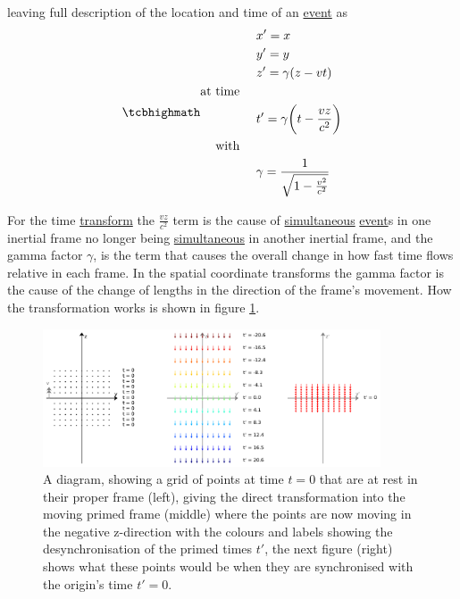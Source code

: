 leaving full description of the location and time of an \hyperlink{def-event}{event} as
\begin{equation}%
	\mhl{
		\begin{aligned}
			 & x'=x                                         \\ & y'=y \\ &z' = \gamma (z-vt)  \\
			\text{at time \ \ \ }                           \\
			 & t'=\gamma \bigg(t-\frac{vz}{c^2}\bigg)       \\
			\text{with \ \ \ }                              \\
			 & \gamma = \dfrac{1}{\sqrt{1-\frac{v^2}{c^2}}}
		\end{aligned}
	}
	\label{eq: Lorentz transformation}
\end{equation}%

For the time \hyperlink{def-transform}{transform} the $\frac{vz}{c^2}$ term is the cause of \hyperlink{def-simultaneity}{simultaneous} \hyperlink{def-event}{event}s in one inertial frame no longer being \hyperlink{def-simultaneity}{simultaneous} in another inertial frame, and the gamma factor $\gamma$, is the term that causes the overall change in how fast time flows relative in each frame. In the spatial coordinate transforms the gamma factor is the cause of the change of lengths in the direction of the frame's movement. How the transformation works is shown in figure \ref{fig: coordinate transform}.

\begin{figure}[H]
	\centering
	\includegraphics[width=10cm]{images/pdf/coordinate_transforms.pdf}
	\caption{A diagram, showing a grid of points at time $t=0$ that are at rest in their proper frame (left), giving the direct transformation into the moving primed frame (middle) where the points are now moving in the negative z-direction with the colours and labels showing the desynchronisation of the primed times $t'$, the next figure (right) shows what these points would be when they are synchronised with the origin's time $t'=0$.}
	\label{fig: coordinate transform}
\end{figure}


